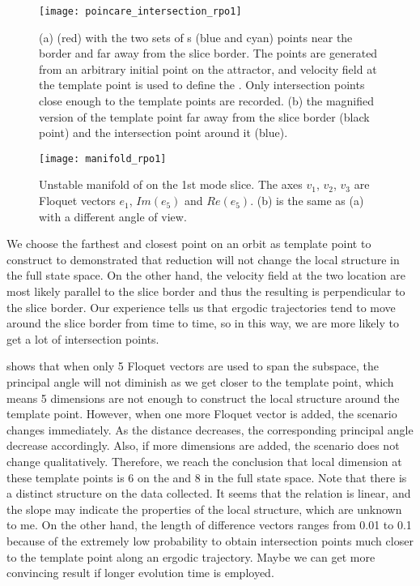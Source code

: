 \begin{description}
\begin{figure}[h]
  \centering
  \texttt{[image: poincare\_intersection\_rpo1]}
  \caption{(a) (red) with the two sets of {\PoincSec s}
    (blue and cyan)
    points near the border and far away from the slice border. The points
    are generated from an arbitrary initial point on the attractor, and
    velocity field at the template point is used to define the {\PoincSec}. Only intersection points close enough to the template points
    are recorded. (b) the magnified version of the template point far away
    from the slice border (black point) and the intersection point around
    it (blue).
  }
  \label{fig:poincare_intersection_rpo1}
\end{figure}

\begin{figure}[h]
  \centering
  \texttt{[image: manifold\_rpo1]}
  \caption{Unstable manifold of  on the 1st mode slice. The
  axes $v_1$, $v_2$, $v_3$ are Floquet vectors $e_1$, $Im(e_5)$ and
  $Re(e_5)$. (b) is the same as (a) with a different angle of view.
}
  \label{fig:manifold_rpo1}
\end{figure}

We choose the farthest and closest point on an orbit as template point
to construct {\PoincSec} to demonstrated that  reduction will
not change the local structure in the full state space. On the other
hand, the velocity field at the two location are most likely parallel
to the slice border and thus the resulting {\PoincSec} is perpendicular
to the slice border. Our experience tells us that ergodic trajectories
tend to move around the slice border from time to time, so in this way,
we are more likely to get a lot of intersection points.

  shows that when only 5 Floquet
vectors are used to span the subspace, the principal angle will not
diminish as we get closer to the template point, which means 5
dimensions are not enough to construct the local structure around the
template point. However, when one more Floquet vector is added, the
scenario changes immediately. As the distance decreases, the
corresponding principal angle decrease accordingly. Also, if more
dimensions are added, the scenario does not change qualitatively.
Therefore, we reach the conclusion that local dimension at these
template points is $6$ on the {\PoincSec} and 8 in the full state
space. Note that there is a distinct structure on the data collected.
It seems that the relation is linear, and the slope may indicate the
properties of the local structure, which are unknown to me. On the
other hand, the length of difference vectors ranges from 0.01 to 0.1
because of the extremely low probability to obtain intersection points
much closer to the template point along an ergodic trajectory. Maybe we
can get more convincing result if longer evolution time is employed.


\end{description}
